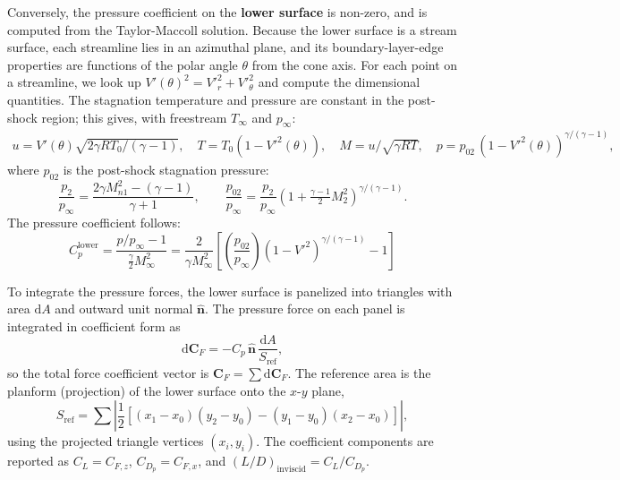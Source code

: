 \documentclass[10pt,a4paper]{article}
\begin{document}
Conversely, the pressure coefficient on the \textbf{lower surface} is non-zero, and is computed from the Taylor-Maccoll solution. Because the lower surface is a stream surface, each streamline lies in an azimuthal plane, and its boundary-layer-edge properties are functions of the polar angle $\theta$ from the cone axis. For each point on a streamline, we look up $V'(\theta)^2 = V'^2_r + V'^2_\theta$ and compute the dimensional quantities. The stagnation temperature and pressure are constant in the post-shock region; this gives, with freestream $T_\infty$ and $p_\infty$:
\begin{gather}
    u = V'(\theta)\sqrt{2\gamma R T_0/(\gamma-1)},\quad
    T = T_0\!\left(1 - V'^2(\theta)\right), \quad
    M = u / \sqrt{\gamma R T},\quad
    p = p_{02}\,{(1-V'^2(\theta))}^{\gamma/(\gamma-1)},
\end{gather}
where $p_{02}$ is the post-shock stagnation pressure:
\begin{equation}
    \frac{p_2}{p_\infty} = \frac{2\gamma M_{n1}^2 - (\gamma-1)}{\gamma+1}, \qquad
    \frac{p_{02}}{p_\infty} = \frac{p_2}{p_\infty}\left(1 + \tfrac{\gamma-1}{2}M_2^2\right)^{\gamma/(\gamma-1)}.
\end{equation}
The pressure coefficient follows:
\begin{equation}
    C_p^\text{lower} = \frac{p/p_\infty - 1}{\tfrac{\gamma}{2}M_\infty^2}
    = \frac{2}{\gamma M_\infty^2}\left[\left(\dfrac{p_{02}}{p_\infty}\right)(1-V'^2)^{\gamma/(\gamma-1)} - 1\right]
\end{equation}

To integrate the pressure forces, the lower surface is panelized into triangles with area $\mathrm{d}A$ and outward unit normal $\hat{\mathbf{n}}$.  The pressure force on each panel is integrated in coefficient form as
\begin{equation}
    \mathrm{d}\mathbf{C}_F = -C_p\,\hat{\mathbf{n}}\,\frac{\mathrm{d}A}{S_{\mathrm{ref}}},
\end{equation}
so the total force coefficient vector is $\mathbf{C}_F = \sum \mathrm{d}\mathbf{C}_F$.  The reference area is the
planform (projection) of the lower surface onto the $x$-$y$ plane,
\begin{equation}
    S_{\mathrm{ref}} = \sum\!\left|\frac{1}{2}
    \left[(x_1-x_0)(y_2-y_0) - (y_1-y_0)(x_2-x_0)\right]\right|,
\end{equation}
using the projected triangle vertices $(x_i,y_i)$. The coefficient components are reported as $C_L = C_{F,z}$, $C_{D_p} = C_{F,x}$, and ${(L/D)}_\text{inviscid} = C_L/C_{D_p}$.
\end{document}
